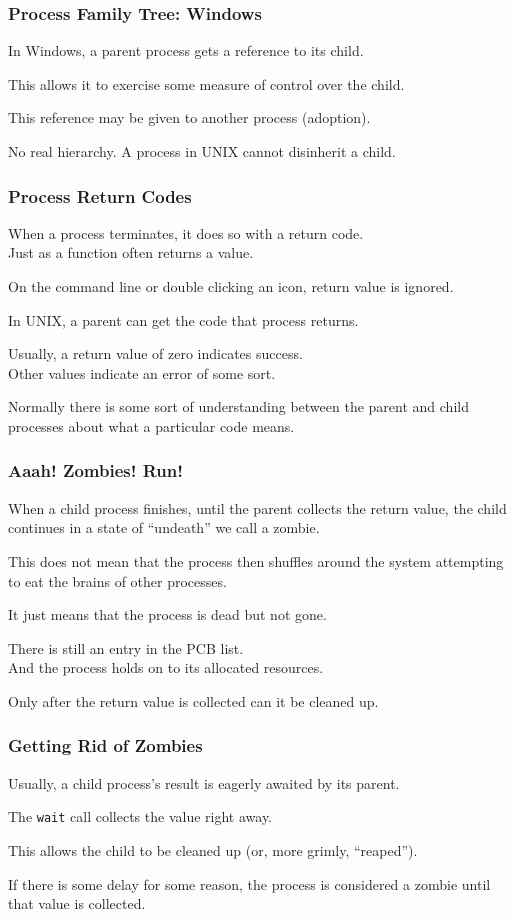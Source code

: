 \begin{frame}
\frametitle{Process Family Tree: Windows}

In Windows, a parent process gets a reference to its child.

This allows it to exercise some measure of control over the child. 

This reference may be given to another process (adoption).

No real hierarchy. A process in UNIX cannot disinherit a child.


\end{frame}

\begin{frame}
\frametitle{Process Return Codes}

When a process terminates, it does so with a return code.\\
\quad  Just as a function often returns a value. 

On the command line or double clicking an icon, return value is ignored.

In UNIX, a parent can get the code that process returns.

Usually, a return value of zero indicates success.\\
\quad Other values indicate an error of some sort. 

Normally there is some sort of understanding between the parent and child processes about what a particular code means. 

\end{frame}


\begin{frame}
\frametitle{Aaah! Zombies! Run!}

When a child process finishes, until the parent collects the return value, the child continues in a state of ``undeath'' we call a \alert{zombie}.

This does not mean that the process then shuffles around the system attempting to eat the brains of other processes.

It just means that the process is dead but not gone.

There is still an entry in the PCB list.\\
\quad And the process holds on to its allocated resources.

Only after the return value is collected can it be cleaned up. 

\end{frame}

\begin{frame}
\frametitle{Getting Rid of Zombies}

Usually, a child process's result is eagerly awaited by its parent. 

The \texttt{wait} call collects the value right away.

This allows the child to be cleaned up (or, more grimly, ``reaped''). 

If there is some delay for some reason, the process is considered a zombie until that value is collected.

\end{frame}


